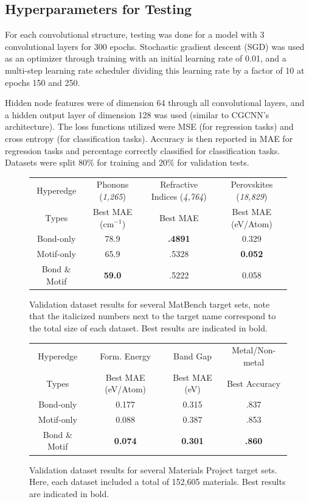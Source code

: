 \documentclass[10pt,a4paper]{article}
\begin{document}
\subsection{Hyperparameters for Testing}
For each convolutional structure, testing was done for a model with 3 convolutional layers for 300 epochs. Stochastic gradient descent (SGD) was used as an optimizer through training with an initial learning rate of 0.01, and a multi-step learning rate scheduler dividing this learning rate by a factor of 10 at epochs 150 and 250. 

Hidden node features were of dimension 64 through all convolutional layers, and a hidden output layer of dimension 128 was used (similar to CGCNN's architecture). The loss functions utilized were MSE (for regression tasks) and cross entropy (for classification tasks). Accuracy is then reported in MAE for regression tasks and percentage correctly classified for classification tasks. Datasets were split 80\% for training and 20\% for validation tests.

 
\begin{figure}
\begin{tabular}{c|ccc}
Hyperedge & Phonons (\textit{1,265}) & Refractive Indices (\textit{4,764})& Perovskites (\textit{18,829}) \\
Types & Best MAE (cm$^{-1}$) & Best MAE & Best MAE (eV/Atom)  \\
\hline
Bond-only & 78.9& \textbf{.4891} & 0.329\\
Motif-only & 65.9& .5328 & \textbf{ 0.052}\\
Bond \& Motif & \textbf{59.0}& .5222 & 0.058\\
\end{tabular}
\caption{Validation dataset results for several MatBench target sets, note that the italicized numbers next to the target name correspond to the total size of each dataset. Best results are indicated in bold.}
\end{figure}

\begin{figure}
\begin{tabular}{c|ccc}
Hyperedge & Form. Energy & Band Gap & Metal/Non-metal \\
Types & Best MAE (eV/Atom) & Best MAE (eV) & Best Accuracy \\
\hline
Bond-only & 0.177 & 0.315 & .837 \\
Motif-only &  0.088 & 0.387 & .853\\
Bond \& Motif &  \textbf{0.074} & \textbf{0.301 } & \textbf{.860}\\
\end{tabular}
\caption{Validation dataset results for several Materials Project target sets. Here, each dataset included a total of 152,605 materials. Best results are indicated in bold.}
\end{figure}
\end{document}
